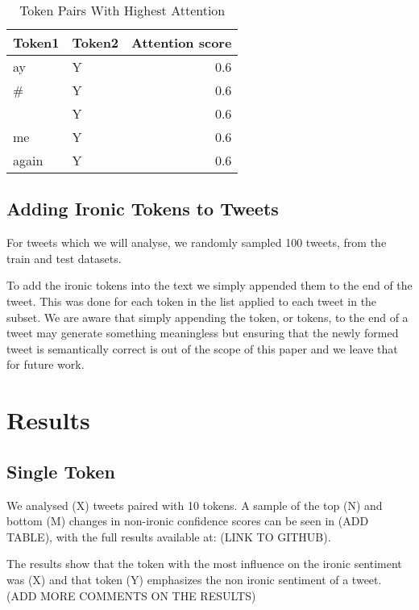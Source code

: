 \documentclass[10pt, a4paper]{article}
\begin{document}
\begin{table*}
\caption{Token Pairs With Highest Attention}
\label{tab:attention-tokens-pairs}
\begin{center}
\begin{tabular}{llr}
\toprule
Token1 & Token2 & Attention score\\
\midrule
ay                  & Y & 0.6 \\
\#                  & Y & 0.6 \\
\textvisiblespace   & Y & 0.6 \\
me                  & Y & 0.6 \\
again               & Y & 0.6 \\
\bottomrule
\end{tabular}
\end{center}
\end{table*}

\subsection{Adding Ironic Tokens to Tweets}

For tweets which we will analyse, we randomly sampled 100 tweets, from the train and test datasets.

To add the ironic tokens into the text we simply appended them to the end of the tweet. This was done for each token in the list applied to each tweet in the subset.
We are aware that simply appending the token, or tokens, to the end of a tweet may generate something meaningless but ensuring that the newly formed tweet is semantically correct is out of the scope of this paper and we leave that for future work.

\section{Results}

\subsection{Single Token}

We analysed (X) tweets paired with 10 tokens. A sample of the top (N) and bottom (M) changes in non-ironic confidence scores can be seen in (ADD TABLE), with the full results available at: (LINK TO GITHUB).

The results show that the token with the most influence on the ironic sentiment was (X) and that token (Y) emphasizes the non ironic sentiment of a tweet. (ADD MORE COMMENTS ON THE RESULTS)
\end{document}
